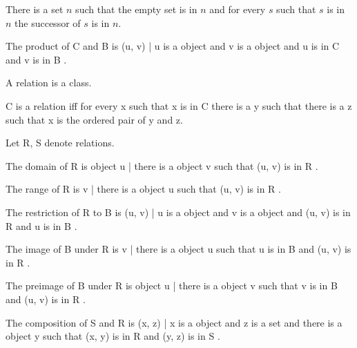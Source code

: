 \documentclass{article}
\begin{document}
\begin{forthel}
    \begin{axiom}[Inf]
      There is a set $n$ such that the empty set is in $n$ and for every $s$
        such that $s$ is in $n$ the successor of $s$ is in $n$.
    \end{axiom}

    \begin{definition}
      The product of C and B is { (u, v) | u is a object and v is a object and u is in C and v is in B }.
    \end{definition}

    \begin{signature}
      A relation is a class.
    \end{signature}

    \begin{axiom}[RelationIntro]
      C is a relation iff for every x such that x is in C
        there is a y such that there is a z such that x is the ordered pair of y and z.
    \end{axiom}

    Let R, S denote relations.

    \begin{definition} 
      The domain of R is { object u | there is a object v such that (u, v) is in R }.
    \end{definition}

    \begin{definition} 
      The range of R is { v | there is a object u such that (u, v) is in R }.
    \end{definition}

    \begin{definition} 
      The restriction of R to B is { (u, v) | u is a object and v is a object and (u, v) is in R and u is in B }.
    \end{definition}

    \begin{definition} 
      The image of B under R is { v | there is a object u such that u is in B and (u, v) is in R }.
    \end{definition}

    \begin{definition} 
      The preimage of B under R is { object u | there is a object v such that v is in B and (u, v) is in R }.
    \end{definition}

    \begin{definition} 
      The composition of S and R is { (x, z) | x is a object and z is a set and there is a object y such that (x, y) is in R and (y, z) is in S }.
    \end{definition}


\end{forthel}
\end{document}
